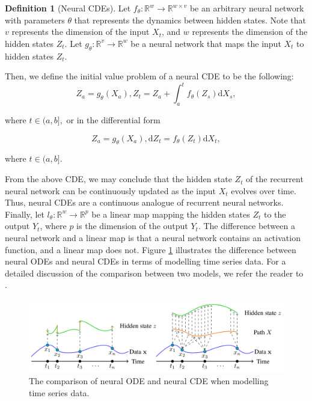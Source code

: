 \documentclass[a4paper,11pt,titlepage]{article}
\theoremstyle{definition}
\newtheorem{definition}{Definition}[section]
\theoremstyle{plain}
\theoremstyle{remark}
\begin{document}
\begin{definition}
    [Neural CDEs] Let $f_\theta:\mathbb{R}^w\rightarrow\mathbb{R}^{w\times v}$ be an arbitrary neural network with parameters $\theta$ that represents the dynamics between hidden states. Note that $v$ represents the dimension of the input $X_t$, and $w$ represents the dimension of the hidden states $Z_t$. Let $g_\theta:\mathbb{R}^v\rightarrow\mathbb{R}^w$ be a neural network that maps the input $X_t$ to hidden states $Z_t$.

Then, we define the initial value problem of a neural CDE to be the following:
$$Z_a=g_\theta(X_a), Z_t=Z_a+\int_a^tf_\theta(Z_s)\mathrm{d}X_s,$$ 

where $t\in(a,b],$ or in the differential form

$$Z_a=g_\theta(X_a), \mathrm{d}Z_t=f_\theta(Z_t)\mathrm{d}X_t,$$ 

where $t\in(a,b].$ \cite{kidger2022neural}
\end{definition}

From the above CDE, we may conclude that the hidden state $Z_t$ of the recurrent neural network can be continuously updated as the input $X_t$ evolves over time. Thus, neural CDEs are a continuous analogue of recurrent neural networks. Finally, let $l_\theta:\mathbb{R}^w\rightarrow\mathbb{R}^p$ be a linear map mapping the hidden states $Z_t$ to the output $Y_t$, where $p$ is the dimension of the output $Y_t$. The difference between a neural network and a linear map is that a neural network contains an activation function, and a linear map does not. Figure \ref{fig:nodesncdes} illustrates the difference between neural ODEs and neural CDEs in terms of modelling time series data. For a detailed discussion of the comparison between two models, we refer the reader to \cite{kidger2020}.

\begin{figure}[htbp]
    \centering
    \includegraphics[width=0.75\linewidth]{report/figures/ODE vs CDE implementation Neural CDE for irregular time series.jpeg}
    \caption{The comparison of neural ODE and neural CDE when modelling time series data. \cite{kidger2020}}
    \label{fig:nodesncdes}
\end{figure}
\end{document}
